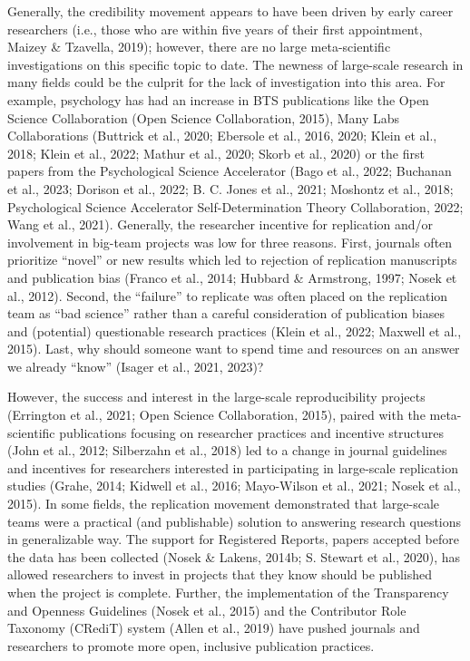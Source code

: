 \documentclass[
  man,mask,floatsintext]{apa7}
\begin{document}
Generally, the credibility movement appears to have been driven by early career
researchers (i.e., those who are within five years of their first
appointment, Maizey \& Tzavella, 2019); however, there are no large meta-scientific
investigations on this specific topic to date. The newness of large-scale research in many fields could be the culprit for the lack of investigation into this area. For example, psychology has had an increase in BTS publications like the Open
Science Collaboration (Open Science Collaboration, 2015), Many Labs
Collaborations (Buttrick et al., 2020; Ebersole et al., 2016, 2020; Klein et al., 2018; Klein et al., 2022; Mathur et al., 2020; Skorb et al., 2020) or the first papers from the
Psychological Science Accelerator (Bago et al., 2022; Buchanan et al., 2023; Dorison et al., 2022; B. C. Jones et al., 2021; Moshontz et al., 2018; Psychological Science Accelerator Self-Determination Theory Collaboration, 2022; Wang et al., 2021). Generally, the researcher incentive for
replication and/or involvement in big-team projects was low for three reasons. First, journals often prioritize
``novel'' or new results which led to rejection of replication manuscripts
and publication bias (Franco et al., 2014; Hubbard \& Armstrong, 1997; Nosek et al., 2012). Second,
the ``failure'' to replicate was often placed on the replication team as
``bad science'' rather than a careful consideration of publication biases
and (potential) questionable research practices (Klein et al., 2022; Maxwell et al., 2015). Last, why should someone want to spend time and resources
on an answer we already ``know'' (Isager et al., 2021, 2023)?

However, the success and interest in the large-scale reproducibility
projects (Errington et al., 2021; Open Science Collaboration, 2015), paired
with the meta-scientific publications focusing on researcher practices
and incentive structures (John et al., 2012; Silberzahn et al., 2018) led to a
change in journal guidelines and incentives for researchers interested
in participating in large-scale replication studies (Grahe, 2014; Kidwell et al., 2016; Mayo-Wilson et al., 2021; Nosek et al., 2015). In some fields, the
replication movement demonstrated that large-scale teams were a
practical (and publishable) solution to answering research questions
in generalizable way. The support
for Registered Reports, papers accepted before the data has been
collected (Nosek \& Lakens, 2014b; S. Stewart et al., 2020), has allowed researchers to
invest in projects that they know
should be published when the project is complete. Further, the
implementation of the Transparency and Openness Guidelines (Nosek et al., 2015)
and the Contributor Role Taxonomy (CRediT) system (Allen et al., 2019) have
pushed journals and researchers to promote more open, inclusive
publication practices.
\end{document}
